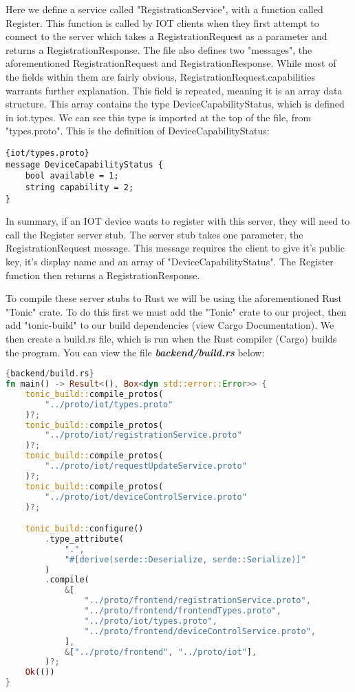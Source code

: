 Here we define a service called "RegistrationService", with a function called Register. This function is called by IOT clients when they first attempt to connect to the server which takes a RegistrationRequest as a parameter and returns a RegistrationResponse. The file also defines two "messages", the aforementioned RegistrationRequest and RegistrationResponse. While most of the fields within them are fairly obvious, RegistrationRequest.capabilities warrants further explanation.
    This field is repeated, meaning it is an array data structure. This array contains the type DeviceCapabilityStatus, which is defined in iot.types. We can see this type is imported at the top of the file, from "types.proto". This is the definition of DeviceCapabilityStatus:

\begin{lstlisting}[language=protobuf3, style=boxed]{iot/types.proto}
message DeviceCapabilityStatus {
    bool available = 1;
    string capability = 2;
}
\end{lstlisting}

In summary, if an IOT device wants to register with this server, they will need to call the Register server stub. The server stub takes one parameter, the RegistrationRequest message. This message requires the client to give it's public key, it's display name and an array of "DeviceCapabilityStatus". The Register function then returns a RegistrationResponse. 

To compile these server stubs to Rust we will be using the aforementioned Rust "Tonic" crate. To do this first we must add the "Tonic" crate to our project, then add "tonic-build" to our build dependencies (view Cargo Documentation). We then create a build.rs file, which is run when the Rust compiler (Cargo) builds the program. You can view the file \textbf{\textit{backend/build.rs}} below:

\begin{lstlisting}[language=Rust, style=boxed, showstringspaces=false]{backend/build.rs}
fn main() -> Result<(), Box<dyn std::error::Error>> {
    tonic_build::compile_protos(
        "../proto/iot/types.proto"
    )?;
    tonic_build::compile_protos(
        "../proto/iot/registrationService.proto"
    )?;
    tonic_build::compile_protos(
        "../proto/iot/requestUpdateService.proto"
    )?;
    tonic_build::compile_protos(
        "../proto/iot/deviceControlService.proto"
    )?;

    tonic_build::configure()
        .type_attribute(
            ".", 
            "#[derive(serde::Deserialize, serde::Serialize)]"
        )
        .compile(
            &[
                "../proto/frontend/registrationService.proto",
                "../proto/frontend/frontendTypes.proto",
                "../proto/iot/types.proto",
                "../proto/frontend/deviceControlService.proto",
            ],
            &["../proto/frontend", "../proto/iot"],
        )?;
    Ok(())
}
\end{lstlisting}

